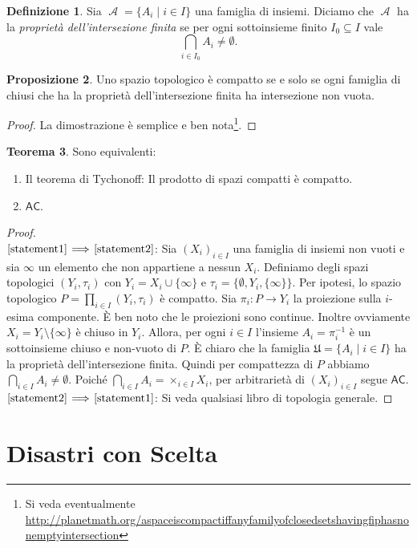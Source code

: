 \documentclass[12pt,a4paper]{report}
\theoremstyle{definition}
\newtheorem{teo}{Teorema}[section]  %
\newtheorem{defn}[teo]{Definizione}  %
\newtheorem{prop}[teo]{Proposizione}  %
\theoremstyle{num.custom-title}
\DeclareMathOperator{\A}{\mathcal{A}}
\DeclareMathOperator{\U}{\mathcal{U}}
\DeclareMathOperator{\sm}{\setminus}
\newcommand{\AC}{\ensuremath{\mathsf{AC}}\xspace}
\renewcommand{\U}{\mathfrak{U}}
\newcommand{\Implies}[2]{$\text{\ref{statement#1}}\!\implies\!\text{\ref{statement#2}}$}%
\newcommand{\punto}[1]{\item \label{statement#1}}
\newenvironment{equivalence}
    {\begin{enumerate}[label=(\arabic*),ref=(\arabic*)]
    }
    { 
	\end{enumerate}
    }
\begin{document}
\begin{defn}
Sia $\A=\{A_i \mid i \in I\}$ una famiglia di insiemi. Diciamo che $\A$ ha la \emph{proprietà dell'intersezione finita} se per ogni sottoinsieme finito $I_0 \subseteq I$ vale 
\[
\bigcap_{i \in I_0} A_i \neq \emptyset.
\]
\end{defn}

\begin{prop}
Uno spazio topologico è compatto se e solo se ogni famiglia di chiusi che ha la proprietà dell'intersezione finita ha intersezione non vuota.
\begin{proof}
La dimostrazione è semplice e ben nota\footnote{Si veda eventualmente\\ \url{http://planetmath.org/aspaceiscompactiffanyfamilyofclosedsetshavingfiphasnonemptyintersection}}.
\end{proof}
\end{prop}

\begin{teo} Sono equivalenti:
\begin{equivalence}
\punto{1} Il teorema di Tychonoff: Il prodotto di spazi compatti è compatto.
\punto{2} \AC.
\end{equivalence}
\begin{proof}\ \\
\Implies{1}{2}: Sia $(X_i)_{i \in I}$ una famiglia di insiemi non vuoti e sia $\infty$ un elemento che non appartiene a nessun $X_i$. Definiamo degli spazi topologici $(Y_i, \tau_i)$ con $Y_i = X_i \cup \{\infty\}$ e $\tau_i=\big\{\emptyset, Y_i, \{\infty\}\big\}$. Per ipotesi, lo spazio topologico $P= \prod_{i \in I} (Y_i, \tau_i)$ è compatto. Sia $\pi_i: P \to Y_i$ la proiezione sulla $i$-esima componente. È ben noto che le proiezioni sono continue. Inoltre ovviamente $X_i=Y_i \sm \{\infty\}$ è chiuso in $Y_i$. Allora, per ogni $i \in I$ l'insieme $A_i=\pi_i^{-1}$ è un sottoinsieme chiuso e non-vuoto di $P$. È chiaro che la famiglia $\U=\{A_i \mid i \in I\}$ ha la proprietà dell'intersezione finita. Quindi per compattezza di $P$ abbiamo $\bigcap_{i \in I} A_i \neq \emptyset$. Poiché $\bigcap_{i \in I} A_i = \times_{i \in I} X_i$, per arbitrarietà di $(X_i)_{i \in I}$ segue \AC.\\
\Implies{2}{1}: Si veda qualsiasi libro di topologia generale.
\end{proof}
\end{teo}



\chapter{Disastri con Scelta}
\end{document}
